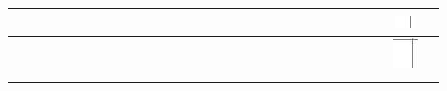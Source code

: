 \documentclass[10pt]{article}
\begin{document}
\begin{center}
\begin{tabular}{|c|c|c|c|c|c|c|c|c|c|c|c|c|c|c|c|c|c|c|c|c|c|c|c|c|c|c|c|c|}
 &  &  &  &  &  &  &  &  &  &  &  &  &  &  &  &  &  &  &  &  &  &  &  &  &  &  & \includegraphics[max width=\textwidth]{2024_11_21_832f1bc2b626663f1df2g-11(1)}
 &  \\
\hline
 &  &  &  &  &  &  &  &  &  &  &  &  &  &  &  &  &  &  &  &  &  &  &  &  &  &  & \includegraphics[max width=\textwidth]{2024_11_21_832f1bc2b626663f1df2g-11(2)}
 &  \\
\hline
 &  &  &  &  &  &  &  &  &  &  &  &  &  &  &  &  &  &  &  &  &  &  &  &  &  &  &  &  \\

\end{tabular}
\end{center}
\end{document}
